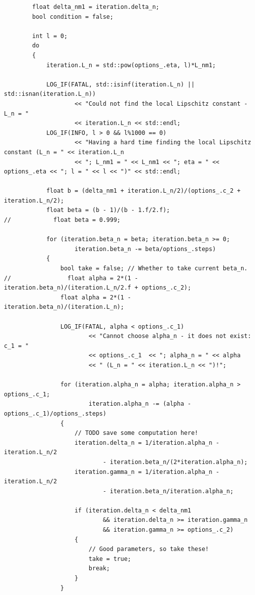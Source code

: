 \documentclass[onecolumn,final,a4paper,13pt,reqno]{siamart}
\begin{document}
\begin{appendix}
\begin{lstlisting}
        float delta_nm1 = iteration.delta_n;
        bool condition = false;
        
        int l = 0;
        do
        {
            iteration.L_n = std::pow(options_.eta, l)*L_nm1;
            
            LOG_IF(FATAL, std::isinf(iteration.L_n) || std::isnan(iteration.L_n)) 
                    << "Could not find the local Lipschitz constant - L_n = " 
                    << iteration.L_n << std::endl;
            LOG_IF(INFO, l > 0 && l%1000 == 0) 
                    << "Having a hard time finding the local Lipschitz constant (L_n = " << iteration.L_n 
                    << "; L_nm1 = " << L_nm1 << "; eta = " << options_.eta << "; l = " << l << ")" << std::endl;
            
            float b = (delta_nm1 + iteration.L_n/2)/(options_.c_2 + iteration.L_n/2);
            float beta = (b - 1)/(b - 1.f/2.f);
//            float beta = 0.999;
            
            for (iteration.beta_n = beta; iteration.beta_n >= 0; 
                    iteration.beta_n -= beta/options_.steps)
            {
                bool take = false; // Whether to take current beta_n.
//                float alpha = 2*(1 - iteration.beta_n)/(iteration.L_n/2.f + options_.c_2);
                float alpha = 2*(1 - iteration.beta_n)/(iteration.L_n);
                
                LOG_IF(FATAL, alpha < options_.c_1)
                        << "Cannot choose alpha_n - it does not exist: c_1 = " 
                        << options_.c_1  << "; alpha_n = " << alpha
                        << " (L_n = " << iteration.L_n << ")!";
                
                for (iteration.alpha_n = alpha; iteration.alpha_n > options_.c_1; 
                        iteration.alpha_n -= (alpha - options_.c_1)/options_.steps)
                {
                    // TODO save some computation here!
                    iteration.delta_n = 1/iteration.alpha_n - iteration.L_n/2 
                            - iteration.beta_n/(2*iteration.alpha_n);
                    iteration.gamma_n = 1/iteration.alpha_n - iteration.L_n/2 
                            - iteration.beta_n/iteration.alpha_n;
                    
                    if (iteration.delta_n < delta_nm1
                            && iteration.delta_n >= iteration.gamma_n 
                            && iteration.gamma_n >= options_.c_2)
                    {
                        // Good parameters, so take these!
                        take = true;
                        break;
                    }
                }
                

\end{lstlisting}
\end{appendix}
\end{document}
